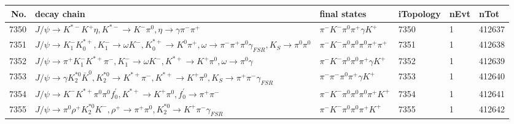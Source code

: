 \begin{table}[htbp] 
\begin{center}
\begin{small}
\begin{tabular}{rlllll}\hline\hline
 No. & decay chain & final states &  iTopology & nEvt & nTot \\\hline
7350&$J/\psi       \rightarrow K^{*-}         K^{+}          \eta          , K^{*-}          \rightarrow K^{-}          \pi^{0}        , \eta           \rightarrow \gamma       \pi^{-}        \pi^{+}        $&$\pi^{-}        K^{-}          \pi^{0}        \pi^{+}        \gamma       K^{+}          $& 7350&    1&412637\\
7351&$J/\psi       \rightarrow K_{1}^{-}      K_{0}^{*+}     , K_{1}^{-}       \rightarrow \omega         K^{-}          , K_{0}^{*+}      \rightarrow K^{0}          \pi^{+}        , \omega          \rightarrow \pi^{-}        \pi^{+}        \pi^{0}        \gamma_{FSR} , K_{S}           \rightarrow \pi^{0}        \pi^{0}        $&$\pi^{-}        K^{-}          \pi^{0}        \pi^{0}        \pi^{0}        \pi^{+}        \pi^{+}        $& 7351&    1&412638\\
7352&$J/\psi       \rightarrow \pi^{+}        K_{1}^{-}      K^{*+}         \pi^{-}        , K_{1}^{-}       \rightarrow \omega         K^{-}          , K^{*+}          \rightarrow K^{+}          \pi^{0}        , \omega          \rightarrow \pi^{0}        \gamma       $&$\pi^{-}        K^{-}          \pi^{0}        \pi^{0}        \pi^{+}        \gamma       K^{+}          $& 7352&    1&412639\\
7353&$J/\psi       \rightarrow \gamma       K_2^{*0}       \bar{K}^{0}   , K_2^{*0}        \rightarrow K^{*+}         \pi^{-}        , K^{*+}          \rightarrow K^{+}          \pi^{0}        , K_{S}           \rightarrow \pi^{+}        \pi^{-}        \gamma_{FSR} $&$\pi^{-}        \pi^{-}        \pi^{0}        \pi^{+}        \gamma       K^{+}          $& 7353&    1&412640\\
7354&$J/\psi       \rightarrow K^{-}          K^{*+}         \pi^{0}        \pi^{0}        f^{'}_{0}     , K^{*+}          \rightarrow K^{+}          \pi^{0}        , f^{'}_{0}      \rightarrow \pi^{+}        \pi^{-}        $&$\pi^{-}        K^{-}          \pi^{0}        \pi^{0}        \pi^{0}        \pi^{+}        K^{+}          $& 7354&    1&412641\\
7355&$J/\psi       \rightarrow \pi^{0}        \rho^{+}      K_2^{*0}       K^{-}          , \rho^{+}       \rightarrow \pi^{+}        \pi^{0}        , K_2^{*0}        \rightarrow K^{+}          \pi^{-}        \gamma_{FSR} $&$\pi^{-}        K^{-}          \pi^{0}        \pi^{0}        \pi^{+}        K^{+}          $& 7355&    1&412642\\

\end{tabular}
\end{small}
\end{center}
\end{table}
